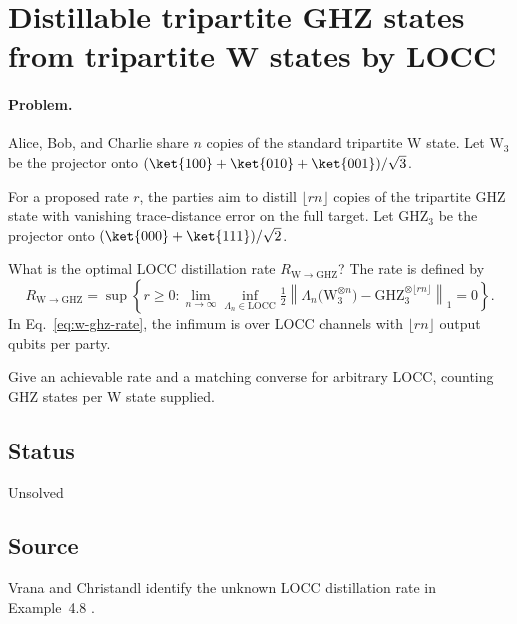 \section{Distillable tripartite GHZ states from tripartite W states by LOCC}
\label{sec:op_89a8760b846e58b1}

\paragraph{Problem.}
Alice, Bob, and Charlie share $n$ copies of the standard tripartite W state. Let $\mathrm{W}_3$ be the projector onto $(\ket{100}+\ket{010}+\ket{001})/\sqrt{3}$.

For a proposed rate $r$, the parties aim to distill $\lfloor rn\rfloor$ copies of the tripartite GHZ state with vanishing trace-distance error on the full target. Let $\mathrm{GHZ}_3$ be the projector onto $(\ket{000}+\ket{111})/\sqrt{2}$.

What is the optimal LOCC distillation rate $R_{\mathrm{W}\to\mathrm{GHZ}}$? The rate is defined by
\begin{equation}
  R_{\mathrm{W}\to\mathrm{GHZ}}=\sup\left\{r\geq 0:\lim_{n\to\infty}\inf_{\Lambda_n\in\mathrm{LOCC}}
  \tfrac12\left\lVert\Lambda_n\bigl(\mathrm{W}_3^{\otimes n}\bigr)
  -\mathrm{GHZ}_3^{\otimes\lfloor rn\rfloor}\right\rVert_1=0\right\}.
  \label{eq:w-ghz-rate}
\end{equation}
In Eq.~\eqref{eq:w-ghz-rate}, the infimum is over LOCC channels with $\lfloor rn\rfloor$ output qubits per party.

Give an achievable rate and a matching converse for arbitrary LOCC, counting GHZ states per W state supplied.

\subsection*{Status}

Unsolved

\subsection*{Source}

Vrana and Christandl identify the unknown LOCC distillation rate in Example~4.8 .

